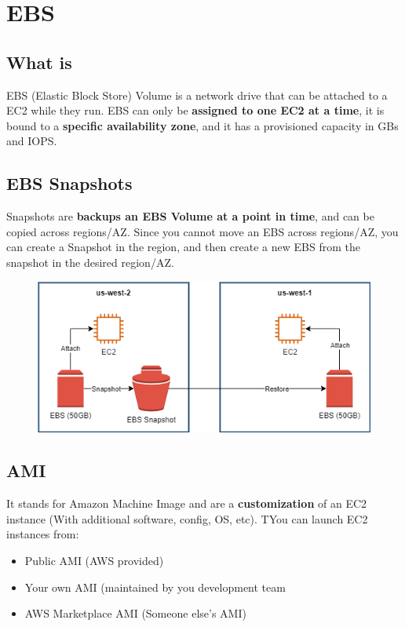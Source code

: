 \section{EBS}\label{sec:ebs}

\subsection{What is}\label{subsec:what-is-ebs}
EBS (Elastic Block Store) Volume is a network drive that can be attached to a EC2 while they run.
EBS can only be \textbf{assigned to one EC2 at a time}, it is bound to a \textbf{specific availability zone}, and it has a provisioned capacity in GBs and IOPS\@.

\subsection{EBS Snapshots}\label{subsec:ebs-snapshots}
Snapshots are \textbf{backups an EBS Volume at a point in time}, and can be copied across regions/AZ. Since you cannot move an EBS across regions/AZ, you can create a Snapshot in the region, and then create a new EBS from the snapshot in the desired region/AZ.

\begin{figure}[h]
\includegraphics[scale=0.5]{ebs/ebs}
\centering\label{fig:ebs}
\end{figure}

\subsection{AMI}\label{subsec:ami}
It stands for Amazon Machine Image and are a \textbf{customization} of an EC2 instance (With additional software, config, OS, etc).
TYou can launch EC2 instances from:
	\begin{itemize}
		\item{Public AMI (AWS provided)}
		\item{Your own AMI (maintained by you development team}
		\item{AWS Marketplace AMI (Someone else's AMI)}
	\end{itemize}

